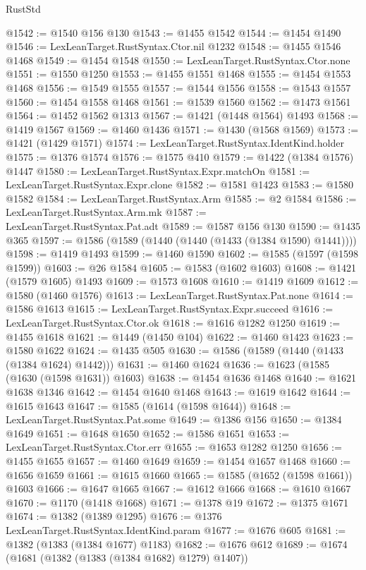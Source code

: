 \begin{lexlean}{RustStd}
\begin{coremodule}
@1542 := @1540 @156 @130
@1543 := @1455 @1542
@1544 := @1454 @1490
@1546 := LexLeanTarget.RustSyntax.Ctor.nil @1232
@1548 := @1455 @1546 @1468
@1549 := @1454 @1548
@1550 := LexLeanTarget.RustSyntax.Ctor.none
@1551 := @1550 @1250
@1553 := @1455 @1551 @1468
@1555 := @1454 @1553 @1468
@1556 := @1549 @1555
@1557 := @1544 @1556
@1558 := @1543 @1557
@1560 := @1454 @1558 @1468
@1561 := @1539 @1560
@1562 := @1473 @1561
@1564 := @1452 @1562 @1313
@1567 := @1421 (@1448 @1564) @1493
@1568 := @1419 @1567
@1569 := @1460 @1436
@1571 := @1430 (@1568 @1569)
@1573 := @1421 (@1429 @1571)
@1574 := LexLeanTarget.RustSyntax.IdentKind.holder
@1575 := @1376 @1574
@1576 := @1575 @410
@1579 := @1422 (@1384 @1576) @1447
@1580 := LexLeanTarget.RustSyntax.Expr.matchOn
@1581 := LexLeanTarget.RustSyntax.Expr.clone
@1582 := @1581 @1423
@1583 := @1580 @1582
@1584 := LexLeanTarget.RustSyntax.Arm
@1585 := @2 @1584
@1586 := LexLeanTarget.RustSyntax.Arm.mk
@1587 := LexLeanTarget.RustSyntax.Pat.adt
@1589 := @1587 @156 @130
@1590 := @1435 @365
@1597 := @1586 (@1589 (@1440 (@1440 (@1433 (@1384 @1590) @1441))))
@1598 := @1419 @1493
@1599 := @1460 @1590
@1602 := @1585 (@1597 (@1598 @1599))
@1603 := @26 @1584
@1605 := @1583 (@1602 @1603)
@1608 := @1421 (@1579 @1605) @1493
@1609 := @1573 @1608
@1610 := @1419 @1609
@1612 := @1580 (@1460 @1576)
@1613 := LexLeanTarget.RustSyntax.Pat.none
@1614 := @1586 @1613
@1615 := LexLeanTarget.RustSyntax.Expr.succeed
@1616 := LexLeanTarget.RustSyntax.Ctor.ok
@1618 := @1616 @1282 @1250
@1619 := @1455 @1618
@1621 := @1449 (@1450 @104)
@1622 := @1460 @1423
@1623 := @1580 @1622
@1624 := @1435 @505
@1630 := @1586 (@1589 (@1440 (@1433 (@1384 @1624) @1442)))
@1631 := @1460 @1624
@1636 := @1623 (@1585 (@1630 (@1598 @1631)) @1603)
@1638 := @1454 @1636 @1468
@1640 := @1621 @1638 @1346
@1642 := @1454 @1640 @1468
@1643 := @1619 @1642
@1644 := @1615 @1643
@1647 := @1585 (@1614 (@1598 @1644))
@1648 := LexLeanTarget.RustSyntax.Pat.some
@1649 := @1386 @156
@1650 := @1384 @1649
@1651 := @1648 @1650
@1652 := @1586 @1651
@1653 := LexLeanTarget.RustSyntax.Ctor.err
@1655 := @1653 @1282 @1250
@1656 := @1455 @1655
@1657 := @1460 @1649
@1659 := @1454 @1657 @1468
@1660 := @1656 @1659
@1661 := @1615 @1660
@1665 := @1585 (@1652 (@1598 @1661)) @1603
@1666 := @1647 @1665
@1667 := @1612 @1666
@1668 := @1610 @1667
@1670 := @1170 (@1418 @1668)
@1671 := @1378 @19
@1672 := @1375 @1671
@1674 := @1382 (@1389 @1295)
@1676 := @1376 LexLeanTarget.RustSyntax.IdentKind.param
@1677 := @1676 @605
@1681 := @1382 (@1383 (@1384 @1677) @1183)
@1682 := @1676 @612
@1689 := @1674 (@1681 (@1382 (@1383 (@1384 @1682) @1279) @1407))

\end{coremodule}
\end{lexlean}
